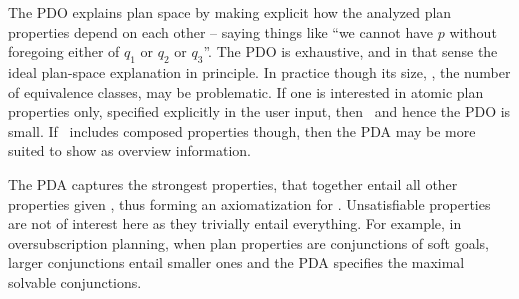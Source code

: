 %

The PDO explains plan space by making explicit how the analyzed plan
properties depend on each other -- saying things like ``we cannot have
$p$ without foregoing either of $q_1$ or $q_2$ or $q_3$''. The PDO is
exhaustive, and in that sense the ideal plan-space explanation in
principle. In practice though its size, \ie, the number of equivalence
classes, may be problematic. If one is interested in atomic plan
properties only, specified explicitly in the user input, then
\props\ and hence the PDO is small. If \props\ includes composed
properties though, then the PDA may be more suited to show as overview
information.

The PDA captures the strongest properties, that together entail all
other properties given \plans, thus forming an axiomatization for
\plans. Unsatisfiable properties are not of interest here as they
trivially entail everything. For example, in oversubscription
planning, when plan properties are conjunctions of soft goals, larger
conjunctions entail smaller ones and the PDA specifies the maximal
solvable conjunctions.

%

